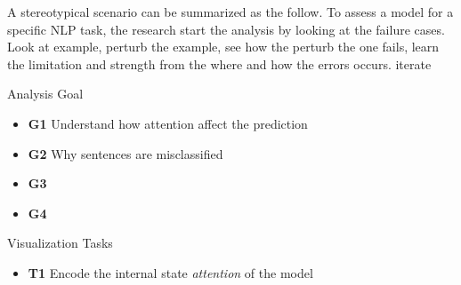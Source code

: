 %
A stereotypical scenario can be summarized as the follow.
To assess a model for a specific NLP task, the research start the analysis by looking at the failure cases.
Look at example, perturb the example, see how the perturb the one fails,
learn the limitation and strength from the where and how the errors occurs. iterate 



Analysis Goal
\begin{itemize}
\item \textbf{G1} Understand how attention affect the prediction 
\item \textbf{G2} Why sentences are misclassified 
\item \textbf{G3} 
\item \textbf{G4} 
\end{itemize}

Visualization Tasks
\begin{itemize}
\item \textbf{T1} Encode the internal state \emph{attention} of the model
\end{itemize}
